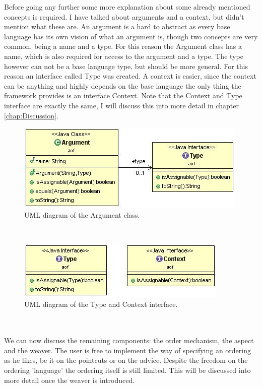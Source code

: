\documentclass[a4paper]{report}
\begin{document}
Before going any further some more explanation about some already mentioned concepts is required. I have talked about arguments and a context, but didn't mention what these are. An argument is a hard to abstract as every base language has its own vision of what an argument is, though two concepts are very common, being a name and a type. For this reason the Argument class has a name, which is also required for access to the argument and a type. The type however can not be a base language type, but should be more general. For this reason an interface called Type was created. A context is easier, since  the context can be anything and highly depends on the base language the only thing the framework provides is an interface Context. Note that the Context and Type interface are exactly the same, I will discuss this into more detail in chapter \ref{chap:Discussion}.
\begin{figure}[h!]
\centering
\includegraphics[scale=0.7]{images/AOF/Argument.jpg}
\caption{UML diagram of the Argument class.}
\label{fig:Argument}
\end{figure}\\
\begin{figure}[h!]
\centering
\includegraphics[scale=0.7]{images/AOF/Type-Context.jpg}
\caption{UML diagram of the Type and Context interface.}
\label{fig:Type-Context}
\end{figure}\\
\\
We can now discuss the remaining components: the order mechanism, the aspect and the weaver. The user is free to implement the way of specifying an ordering as he likes, be it on the pointcuts or on the advice. Despite the freedom on the ordering 'language' the ordering itself is still limited. This will be discussed into more detail once the weaver is introduced.\\
\end{document}
